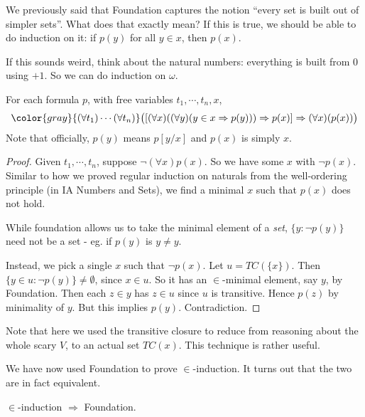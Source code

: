 \documentclass[a4paper]{article}
\begin{document}
We previously said that Foundation captures the notion ``every set is built out of simpler sets''. What does that exactly mean? If this is true, we should be able to do induction on it: if $p(y)$ for all $y\in x$, then $p(x)$.

If this sounds weird, think about the natural numbers: everything is built from $0$ using $+1$. So we can do induction on $\omega$.

\begin{thm}
  For each formula $p$, with free variables $t_1, \cdots, t_n, x$,
  \[
    {\color{gray}{(\forall t_1)\cdots(\forall t_n)}}\big([(\forall x)((\forall y)(y\in x \Rightarrow p(y))) \Rightarrow  p(x)] \Rightarrow  (\forall x)(p(x))\big)
  \]
  Note that officially, $p(y)$ means $p[y/x]$ and $p(x)$ is simply $x$.
\end{thm}

\begin{proof}
  Given $t_1, \cdots, t_n$, suppose $\neg (\forall x)p(x)$. So we have some $x$ with $\neg p(x)$. Similar to how we proved regular induction on naturals from the well-ordering principle (in IA Numbers and Sets), we find a minimal $x$ such that $p(x)$ does not hold.

  While foundation allows us to take the minimal element of a \emph{set}, $\{y: \neg p(y)\}$ need not be a set - eg. if $p(y)$ is $y \not= y$.

  Instead, we pick a single $x$ such that $\neg p(x)$. Let $u = TC(\{x\})$. Then $\{y\in u: \neg p(y)\} \not= \emptyset$, since $x\in u$. So it has an $\in$-minimal element, say $y$, by Foundation. Then each $z\in y$ has $z\in u$ since $u$ is transitive. Hence $p(z)$ by minimality of $y$. But this implies $p(y)$. Contradiction.
\end{proof}
Note that here we used the transitive closure to reduce from reasoning about the whole scary $V$, to an actual set $TC(x)$. This technique is rather useful.

We have now used Foundation to prove $\in$-induction. It turns out that the two are in fact equivalent.

\begin{prop}
  $\in$-induction $\Rightarrow $ Foundation.
\end{prop}
\end{document}
